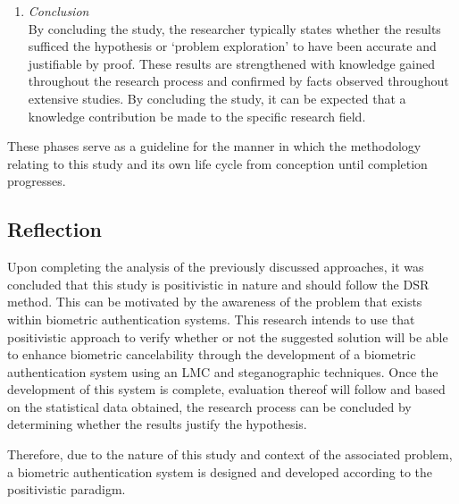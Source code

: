 \begin{enumerate}[label=\roman*.]
	\item \textit{Conclusion} \\
	By concluding the study, the researcher typically states whether the results sufficed the hypothesis or ‘problem exploration’ to have been accurate and justifiable by proof. These results are strengthened with knowledge gained throughout the research process and confirmed by facts observed throughout extensive studies. By concluding the study, it can be expected that a knowledge contribution be made to the specific research field.
\end{enumerate}

These phases serve as a guideline for the manner in which the methodology  relating to this study and its own life cycle from conception until completion progresses. 

\subsection{Reflection}
Upon completing the analysis of the previously discussed approaches, it was concluded that this study is positivistic in nature and should follow the DSR method. This can be motivated by the awareness of the problem that exists within biometric authentication systems. This research intends to use that positivistic approach to verify whether or not the suggested solution will be able to enhance biometric cancelability through the development of a biometric authentication system using an LMC and steganographic techniques. Once the development of this system is complete, evaluation thereof will follow and based on the statistical data obtained, the research process can be concluded by determining whether the results justify the hypothesis.

Therefore, due to the nature of this study and context of the associated problem, a biometric authentication system is designed and developed according to the positivistic paradigm.

